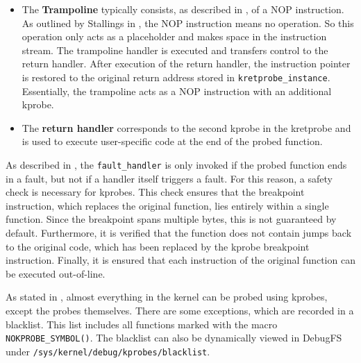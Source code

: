 \begin{itemize}
          Execution then proceeds to either the trampoline or the \texttt{post-handler}.  
          In the \texttt{post-handler}, the return value can be further processed, or additional user code executed.  
          For a \ac{kretprobe}, the \texttt{post-handler} is not executed, as it is replaced by the next \ac{kprobe} triggered via the trampoline.  
          If the function terminates in a fault, such as a page fault, the previously mentioned fault handler is invoked.
          This handler prevents the function from crashing immediately and implements a user-defined routine for handling the error condition.
    \item The \textbf{Trampoline} typically consists, as described in \cite{kprobe_doc}, of a NOP instruction.  
          As outlined by Stallings in \cite[p. 545]{Stallings_2018}, the NOP instruction means no operation.
          So this operation only acts as a placeholder and makes space in the instruction stream.
          The trampoline handler is executed and transfers control to the return handler.  
          After execution of the return handler, the instruction pointer is restored to the original return address stored in \texttt{kretprobe\_instance}.  
          Essentially, the trampoline acts as a NOP instruction with an additional \ac{kprobe}.  
    \item The \textbf{return handler} corresponds to the second \ac{kprobe} in the \ac{kretprobe} and is used to execute user-specific code at the end of the probed function.  
\end{itemize}

As described in \cite{kprobe_doc}, the \texttt{fault\_handler} is only invoked if the probed function ends in a fault, but not if a handler itself triggers a fault.  
For this reason, a safety check is necessary for \acp{kprobe}.  
This check ensures that the breakpoint instruction, which replaces the original function, lies entirely within a single function.  
Since the breakpoint spans multiple bytes, this is not guaranteed by default.  
Furthermore, it is verified that the function does not contain jumps back to the original code, which has been replaced by the \ac{kprobe} breakpoint instruction.  
Finally, it is ensured that each instruction of the original function can be executed out-of-line.  

As stated in \cite{kprobe_doc}, almost everything in the kernel can be probed using \acp{kprobe}, except the probes themselves.  
There are some exceptions, which are recorded in a blacklist.  
This list includes all functions marked with the macro \texttt{NOKPROBE\_SYMBOL()}.  
The blacklist can also be dynamically viewed in DebugFS under \texttt{/sys/kernel/debug/kprobes/blacklist}.  

